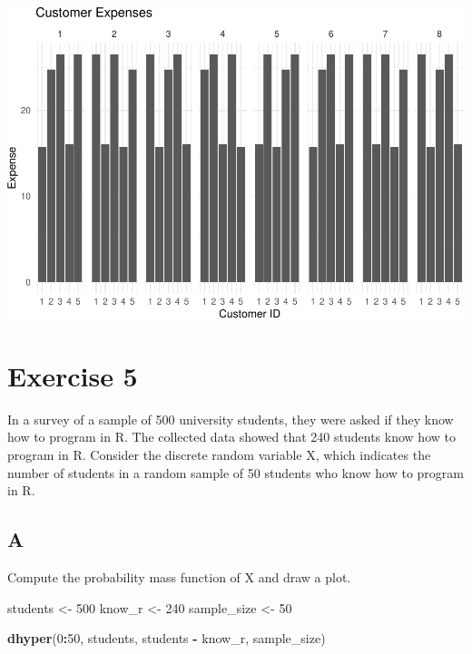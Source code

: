 \documentclass[
]{article}
\newenvironment{Shaded}{\begin{snugshade}}{\end{snugshade}}
\newcommand{\DecValTok}[1]{\textcolor[rgb]{0.00,0.00,0.81}{#1}}
\newcommand{\KeywordTok}[1]{\textcolor[rgb]{0.13,0.29,0.53}{\textbf{#1}}}
\newcommand{\NormalTok}[1]{#1}
\newcommand{\OperatorTok}[1]{\textcolor[rgb]{0.81,0.36,0.00}{\textbf{#1}}}
\newcommand{\StringTok}[1]{\textcolor[rgb]{0.31,0.60,0.02}{#1}}
\begin{document}
\includegraphics{es_files/figure-latex/unnamed-chunk-21-1.pdf}

\hypertarget{exercise-5}{%
\section{Exercise 5}\label{exercise-5}}

In a survey of a sample of 500 university students, they were asked if
they know how to program in R. The collected data showed that 240
students know how to program in R. Consider the discrete random variable
X, which indicates the number of students in a random sample of 50
students who know how to program in R.

\hypertarget{a-4}{%
\subsection{A}\label{a-4}}

Compute the probability mass function of X and draw a plot.

\begin{Shaded}
\begin{Highlighting}[]
\NormalTok{students \textless{}{-}}\StringTok{ }\DecValTok{500}
\NormalTok{know\_r \textless{}{-}}\StringTok{ }\DecValTok{240}
\NormalTok{sample\_size \textless{}{-}}\StringTok{ }\DecValTok{50}

\KeywordTok{dhyper}\NormalTok{(}\DecValTok{0}\OperatorTok{:}\DecValTok{50}\NormalTok{, students, students }\OperatorTok{{-}}\StringTok{ }\NormalTok{know\_r, sample\_size)}
\end{Highlighting}
\end{Shaded}
\end{document}
